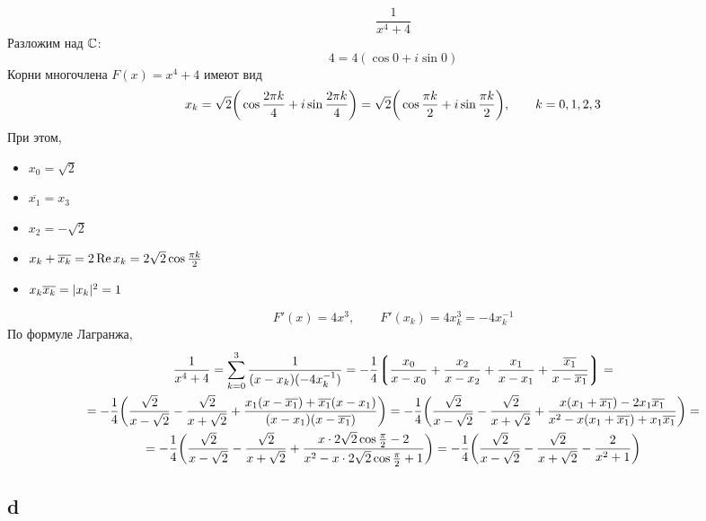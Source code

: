 $$ \frac1{x^4 + 4} $$
Разложим над $ \Co $:
$$ 4 = 4(\cos 0 + i \sin 0) $$
Корни многочлена $ F(x) = x^4 + 4 $ имеют вид
$$ x_k = \sqrt2 \bigg( \cos \frac{2\pi k}4 + i \sin \frac{2\pi k}4 \bigg) = \sqrt2 \bigg( \cos \half[\pi k] + i\sin \half[\pi k] \bigg), \qquad k = 0, 1, 2, 3 $$
При этом,
\begin{itemize}
	\item $ x_0 = \sqrt2 $
    \item $ \overline{x_1} = x_3 $
    \item $ x_2 = -\sqrt2 $
    \item $ x_k + \ol{x_k} = 2 \operatorname{Re} x_k = 2\sqrt2 \cos \half[\pi k] $
    \item $ x_k\ol{x_k} = |x_k|^2 = 1 $
\end{itemize}
$$ F'(x) = 4x^3, \qquad F'(x_k) = 4x_k^3 = -4x_k^{-1} $$
По формуле Лагранжа,
\begin{multline*}
    \frac1{x^4 + 4} = \sum_{k = 0}^3 \frac1{(x - x_k)(-4x_k^{-1})} = -\frac14 \bigg\lgroup \frac{x_0}{x - x_0} + \frac{x_2}{x - x_2} + \frac{x_1}{x - x_1} + \frac{\ol{x_1}}{x - \ol{x_1}} \bigg\rgroup = \\
    = -\frac14 \bigg( \frac{\sqrt2}{x - \sqrt2} - \frac{\sqrt2}{x + \sqrt2} + \frac{x_1(x - \ol{x_1}) + \ol{x_1}(x - x_1)}{(x - x_1)(x - \ol{x_1})} \bigg) = -\frac14 \bigg( \frac{\sqrt2}{x - \sqrt2} - \frac{\sqrt2}{x + \sqrt2} + \frac{x(x_1 + \ol{x_1}) - 2x_1\ol{x_1}}{x^2 - x(x_1 + \ol{x_1}) + x_1\ol{x_1}} \bigg) = \\
    = -\frac14 \bigg( \frac{\sqrt2}{x - \sqrt2} - \frac{\sqrt2}{x + \sqrt2} + \frac{x \cdot 2\sqrt2\cos\half[\pi] - 2}{x^2 - x \cdot 2\sqrt2\cos\half[\pi] + 1} \bigg) = -\frac14 \bigg( \frac{\sqrt2}{x - \sqrt2} - \frac{\sqrt2}{x + \sqrt2} - \frac2{x^2 + 1} \bigg)
\end{multline*}

\subsection{d}

